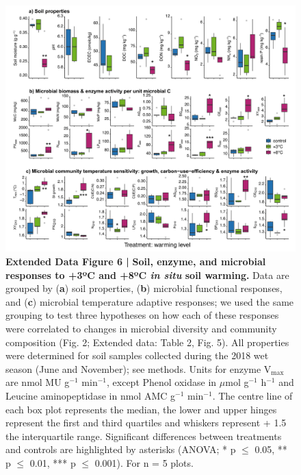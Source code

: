 \documentclass[
  letterpaper,
  DIV=11,
  numbers=noendperiod]{scrartcl}
\begin{document}
\begin{figure}

{\centering \includegraphics[width=1\textwidth,height=\textheight]{FIGURES/Extended_Data_Fig_6.png}

}

\caption{\textbf{Extended Data Figure 6 |}
\textbf{Soil, enzyme, and microbial responses to +3ºC and +8ºC \textsl{in situ} soil warming.}
Data are grouped by (\textbf{a}) soil properties, (\textbf{b}) microbial
functional responses, and (\textbf{c}) microbial temperature adaptive
responses; we used the same grouping to test three hypotheses on how
each of these responses were correlated to changes in microbial
diversity and community composition (Fig. 2; Extended data: Table 2,
Fig. 5). All properties were determined for soil samples collected
during the 2018 wet season (June and November); see methods. Units for
enzyme V\(_{\mathrm{max}}\) are nmol MU g\(^{-1}\) min\(^{-1}\), except
Phenol oxidase in \(\mu\)mol g\(^{-1}\) h\(^{-1}\) and Leucine
aminopeptidase in nmol AMC g\(^{-1}\) min\(^{-1}\). The centre line of
each box plot represents the median, the lower and upper hinges
represent the first and third quartiles and whiskers represent + 1.5 the
interquartile range. Significant differences between treatments and
controls are highlighted by asterisks (ANOVA; * p \(\le\) 0.05, ** p
\(\le\) 0.01, *** p \(\le\) 0.001). For n = 5 plots.}

\end{figure}
\end{document}
